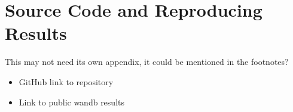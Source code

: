 \chapter{Source Code and Reproducing Results}

{\color{red}
This may not need its own appendix, it could be mentioned in the footnotes?

\begin{itemize}
    \item GitHub link to repository
    \item Link to public wandb results
\end{itemize}
}